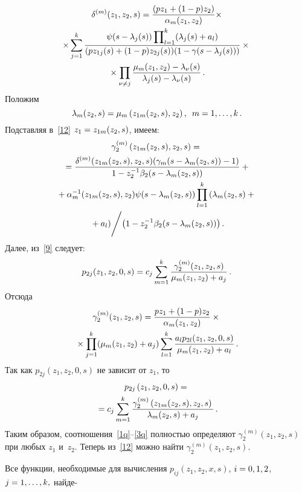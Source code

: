 \begin{multicols}{2}
\begin{multline*}
\delta^{(m)}(z_1,z_2,s)=\displaystyle\frac{\displaystyle (pz_1+(1-p)z_2)\mathstrut}{\displaystyle \alpha_m(z_1,z_2)\mathstrut}\times
\\
\times\sum\limits_{j=1}^k
\displaystyle\frac{\displaystyle \psi(s-\lambda_j(s))\prod\nolimits_{l=1}^k(\lambda_j(s)+a_l)\mathstrut}{\displaystyle (pz_{1j}(s)+(1-p)z_{2j}(s))(1-\gamma(s-\lambda_j(s)))\mathstrut}\times{}\\
{}\times\prod\limits_{\nu\ne j}
\displaystyle\frac{\displaystyle \mu_m(z_1,z_2)-\lambda_{\nu}(s)\mathstrut}{\displaystyle \lambda_j(s)-\lambda_{\nu}(s)\mathstrut}\,.
\end{multline*}
Положим
$$
\lambda_m(z_2,s)=\mu_m\left(z_{1m}(z_2,s),z_2\right),\enskip m=1,\ldots,k\,.
$$
Подставляя в~\eqref{12} $z_1\hm=z_{1m}(z_2,s)$, имеем:
\begin{multline}
\label{1q}
\gamma_2^{(m)}\left(z_{1m}(z_2,s),z_2,s\right)={}\\
{}=\displaystyle\frac{\displaystyle \delta^{(m)}(z_{1m}(z_2,s),z_2,s)(\gamma_m(s-\lambda_m(z_2,s))-1)\mathstrut}{\displaystyle 1-z_2^{-1}\beta_2(s-\lambda_m(z_2,s))\mathstrut}+{}
\\
{}+\alpha_m^{-1}(z_{1m}(z_2,s),z_2)\psi(s-\lambda_m(z_2,s))
\prod\limits_{l=1}^k\left(\lambda_m(z_2,s)+{}\right.\\
\left.{}+a_l\right)\!\Bigg/\!
\left(
1-z_2^{-1}\beta_2(s-\lambda_m(z_2,s))\right).
\end{multline}
Далее, из~\eqref{9} следует:
$$
p_{2j}(z_1,z_2,0,s)=c_j\sum\limits_{m=1}^k
\displaystyle\frac{\displaystyle \gamma_2^{(m)}(z_1,z_2,s)\mathstrut}{\displaystyle \mu_m(z_1,z_2)+a_j\mathstrut}\,.
$$
Отсюда
\begin{multline}
\label{2q}
\gamma_2^{(m)}(z_1,z_2,s)=\displaystyle\frac{\displaystyle pz_1+(1-p)z_2\mathstrut}{\displaystyle \alpha_m(z_1,z_2)\mathstrut}\times{}\\
{}\times
\prod\limits_{j=1}^k(\mu_m(z_1,z_2)+a_j)
\sum\limits_{l=1}^k\displaystyle\frac{\displaystyle a_lp_{2l}(z_1,z_2,0,s)\mathstrut}{\displaystyle \mu_m(z_1,z_2)+a_l\mathstrut}\,.
\end{multline}
Так как $p_{2j}(z_1,z_2,0,s)$ не зависит от $z_1$, то
\begin{multline}
\label{3q}
p_{2j}\left(z_1,z_2,0,s\right)={}\\
{}=c_j
\sum\limits_{m=1}^k\displaystyle\frac{\displaystyle \gamma_2^{(m)}\left(z_{1m}(z_2,s),z_2,s\right)\mathstrut}{\displaystyle \lambda_m(z_2,s)+a_j\mathstrut}\,.
\end{multline}
Таким образом, соотношения~\eqref{1q}--\eqref{3q} полностью
определяют $\gamma_2^{(m)}(z_1,z_2,s)$ при любых $z_1$ и~$z_2$.
Теперь из~\eqref{12} можно найти $\gamma_2^{(m)}(z_1,z_2,s)$.

Все функции, необходимые для вычисления $p_{ij}(z_1,z_2,x,s)$,
$i\hm=0,1,2$, $j\hm=1,\ldots,k,$ найде-\linebreak\vspace*{-12pt}

\columnbreak


\end{multicols}
